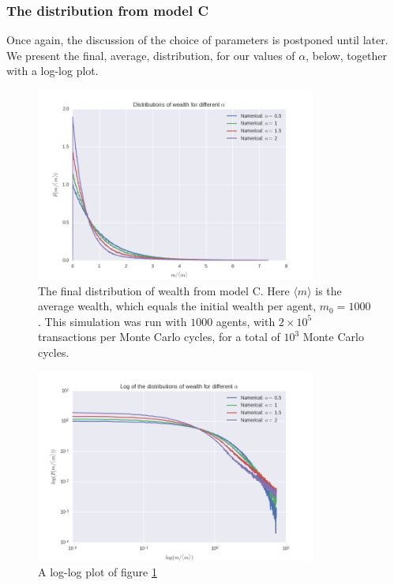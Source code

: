 \documentclass[a4paper, 10pt]{article}
\begin{document}
\subsubsection{The distribution from model C}
Once again, the discussion of the choice of parameters is postponed until later. We present the final, average, distribution, for our values of $\alpha$, below, together with a log-log plot.
\begin{figure}[!ht]
\centering
\includegraphics[height=2.5in]{distAlphas.png} %
\caption{The final distribution of wealth from model C. Here $\langle m \rangle$ is the average wealth, which equals the initial wealth per agent, $m_0=1000$. This simulation was run with $1000$ agents, with $2 \times 10^5$ transactions per Monte Carlo cycles, for a total of $10^3$ Monte Carlo cycles.}\label{fig:ModelC_final_distribution}
\end{figure}
\begin{figure}[!ht]
\centering
\includegraphics[height=2.5in]{logDistAlphas.png} %
\caption{A log-log plot of figure \ref{fig:ModelC_final_distribution}}\label{fig:ModelC_final_distribution_log}
\end{figure}
\newpage
\end{document}
